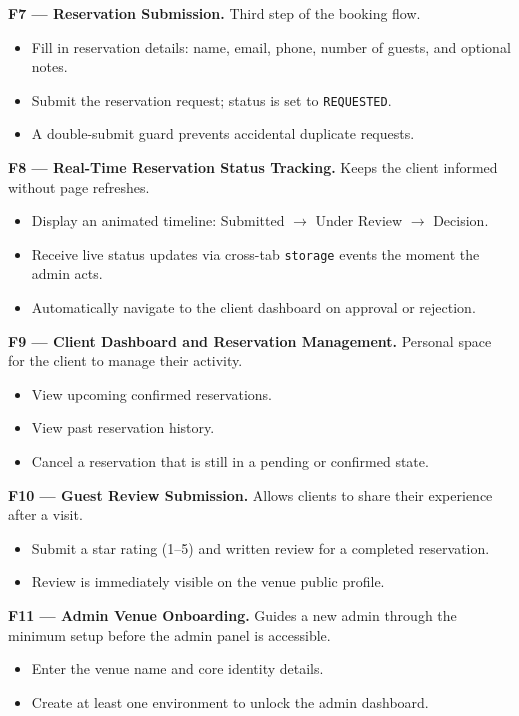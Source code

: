 \documentclass[12pt,a4paper,oneside]{report}
\begin{document}
\textbf{F7 --- Reservation Submission.}
Third step of the booking flow.
\begin{itemize}[leftmargin=1.5em, topsep=2pt, itemsep=1pt]
  \item Fill in reservation details: name, email, phone, number of guests,
        and optional notes.
  \item Submit the reservation request; status is set to \texttt{REQUESTED}.
  \item A double-submit guard prevents accidental duplicate requests.
\end{itemize}

\textbf{F8 --- Real-Time Reservation Status Tracking.}
Keeps the client informed without page refreshes.
\begin{itemize}[leftmargin=1.5em, topsep=2pt, itemsep=1pt]
  \item Display an animated timeline: Submitted $\to$ Under Review $\to$
        Decision.
  \item Receive live status updates via cross-tab \texttt{storage} events
        the moment the admin acts.
  \item Automatically navigate to the client dashboard on approval or
        rejection.
\end{itemize}

\textbf{F9 --- Client Dashboard and Reservation Management.}
Personal space for the client to manage their activity.
\begin{itemize}[leftmargin=1.5em, topsep=2pt, itemsep=1pt]
  \item View upcoming confirmed reservations.
  \item View past reservation history.
  \item Cancel a reservation that is still in a pending or confirmed state.
\end{itemize}

\textbf{F10 --- Guest Review Submission.}
Allows clients to share their experience after a visit.
\begin{itemize}[leftmargin=1.5em, topsep=2pt, itemsep=1pt]
  \item Submit a star rating (1--5) and written review for a completed
        reservation.
  \item Review is immediately visible on the venue public profile.
\end{itemize}

\textbf{F11 --- Admin Venue Onboarding.}
Guides a new admin through the minimum setup before the admin panel is
accessible.
\begin{itemize}[leftmargin=1.5em, topsep=2pt, itemsep=1pt]
  \item Enter the venue name and core identity details.
  \item Create at least one environment to unlock the admin dashboard.
\end{itemize}
\end{document}
